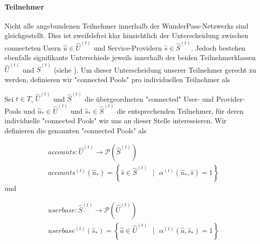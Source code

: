 \paragraph{Teilnehmer} 
\label{sec:eco_zahlen_zustand_wp_advanced_teilnehmer}
\textrm{ }

\vspace{0.3cm}

Nicht alle angebundenen Teilnehmer innerhalb der WunderPass-Netzwerks sind gleichgestellt. Dies ist zweifelsfrei klar hinsichtlich der Unterscheidung zwischen connecteten Usern $\widehat{u} \in \widehat{U}^{(t)}$ und Service-Providern $\widehat{s} \in \widehat{S}^{(t)}$. Jedoch bestehen ebenfalls signifikante Unterschiede jeweils innerhalb der beiden Teilnehmerklassen $\widehat{U}^{(t)}$ und $\widehat{S}^{(t)}$ (siehe ). Um dieser Unterscheidung unserer Teilnehmer gerecht zu werden, definieren wir "connected Pools" pro individuellen Teilnehmer als

\vspace{0.3cm}

\begin{Def}\label{defTeilnehmerPool}

Sei $t \in T$, $\widehat{U}^{(t)}$ und $\widehat{S}^{(t)}$ die übergeordneten "connected" User- und Provider-Pools und $\widehat{u}_{*} \in \widehat{U}^{(t)}$ und $\widehat{s}_{*} \in \widehat{S}^{(t)}$ die entsprechenden Teilnehmer, für deren individuelle "connected Pools" wir uns an dieser Stelle interessieren. Wir definieren die genannten "connected Pools" als

\begin{align*}
&accounts : \widehat{U}^{(t)} \rightarrow \mathcal{P}\left(\widehat{S}^{(t)}\right) \\
&accounts^{(t)}(\widehat{u}_{*}) = \left\{\widehat{s} \in \widehat{S}^{(t)} \textrm{ } | \textrm{ } \alpha^{(t)}(\widehat{u}_{*}, \widehat{s}) = 1 \right\}
\end{align*}
und

\begin{align*}
&userbase : \widehat{S}^{(t)} \rightarrow \mathcal{P}\left(\widehat{U}^{(t)}\right) \\
&userbase^{(t)}(\widehat{s}_{*}) = \left\{\widehat{u} \in \widehat{U}^{(t)} \textrm{ } | \textrm{ } \alpha^{(t)}(\widehat{u}, \widehat{s}_{*}) = 1 \right\}
\end{align*}

\end{Def}

\vspace{0.6cm}

